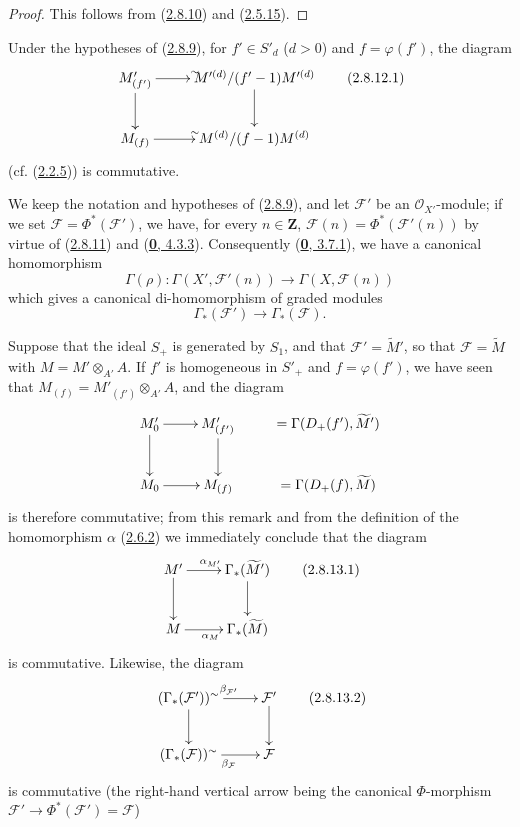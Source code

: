 \begin{proof}
This follows from (\hyperref[II.2.8.10]{2.8.10}) and
(\hyperref[II.2.5.15]{2.5.15}).
\end{proof}


\begin{env}[2.8.12]
\label{II.2.8.12}
Under the hypotheses of (\hyperref[II.2.8.9]{2.8.9}), for
$f'\in S'_d$ ($d>0$) and $f=\varphi(f')$, the diagram
\[
\label{II.2.8.12.1}
  \xymatrix{
    M'_{(f')}\ar[r]^{\sim}\ar[d]
    & M'^{(d)}/(f'-1)M'^{(d)}\ar[d]\\
    M_{(f)}\ar[r]^{\sim}
    & M^{(d)}/(f-1)M^{(d)}
  }
\tag{2.8.12.1}
\]
(cf. (\hyperref[II.2.2.5]{2.2.5})) is commutative.
\end{env}

\begin{env}[2.8.13]
\label{II.2.8.13}
We keep the notation and hypotheses of (\hyperref[II.2.8.9]{2.8.9}), and
let $\mathcal{F}'$ be an $\mathcal{O}_{X'}$-module; if we set
$\mathcal{F}=\Phi^*(\mathcal{F}')$, we have, for every $n\in\mathbf{Z}$,
$\mathcal{F}(n)=\Phi^*(\mathcal{F}'(n))$ by virtue of
(\hyperref[II.2.8.11]{2.8.11}) and
(\hyperref[0.4.3.3]{\textbf{0}, 4.3.3}). Consequently
(\hyperref[0.3.7.1]{\textbf{0}, 3.7.1}), we have a canonical homomorphism
\[
  \Gamma(\rho):\Gamma(X',\mathcal{F}'(n))
  \longrightarrow\Gamma(X,\mathcal{F}(n))
\]
which gives a canonical di-homomorphism of graded modules
\[
  \Gamma_*(\mathcal{F}')\longrightarrow
  \Gamma_*(\mathcal{F}).
\]

Suppose that the ideal $S_+$ is generated by $S_1$, and that
$\mathcal{F}'=\widetilde{M}'$, so that $\mathcal{F}=\widetilde{M}$ with
$M=M'\otimes_{A'}A$. If $f'$ is homogeneous in $S'_+$ and
$f=\varphi(f')$, we have seen that
$M_{(f)}=M'_{(f')}\otimes_{A'}A$, and the diagram
\[
  \xymatrix{
    M'_0\ar[r]\ar[d]
    & M'_{(f')}\ar[d]
    & =\Gamma(D_+(f'),\widetilde{M}')\\
    M_0\ar[r]
    & M_{(f)}
    & =\Gamma(D_+(f),\widetilde{M})
  }
\]
is therefore commutative; from this remark and from the definition of the
homomorphism $\alpha$ (\hyperref[II.2.6.2]{2.6.2}) we immediately conclude
that the diagram
\[
\label{II.2.8.13.1}
  \xymatrix{
    M'\ar[r]^{\alpha_{M'}}\ar[d]
    & \Gamma_*(\widetilde{M}')\ar[d]\\
    M\ar[r]_{\alpha_M}
    & \Gamma_*(\widetilde{M})
  }
\tag{2.8.13.1}
\]
is commutative. Likewise, the diagram
\[
\label{II.2.8.13.2}
  \xymatrix{
    (\Gamma_*(\mathcal{F}'))\supertilde\ar[r]^{\beta_{\mathcal{F}'}}
      \ar[d]
    & \mathcal{F}'\ar[d]\\
    (\Gamma_*(\mathcal{F}))\supertilde\ar[r]_{\beta_{\mathcal{F}}}
    & \mathcal{F}
  }
\tag{2.8.13.2}
\]
is commutative (the right-hand vertical arrow being the canonical
$\Phi$-morphism
$\mathcal{F}'\to\Phi^*(\mathcal{F}')=\mathcal{F}$)
\end{env}

